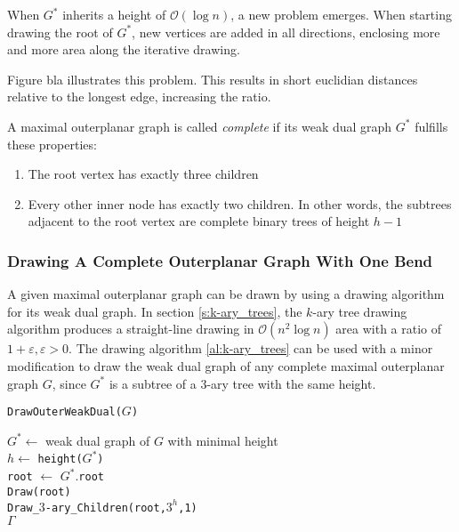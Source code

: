 When $G^*$ inherits a height of $\mathcal{O}(\log n)$, a new problem emerges. When starting drawing the root of $G^*$, new vertices are added in all directions, enclosing more and more area along the iterative drawing. 

Figure bla illustrates this problem. 
This results in short euclidian distances relative to the longest edge, increasing the ratio.\\
\begin{definition}
A maximal outerplanar graph is called \emph{complete} if its weak dual graph $G^*$ fulfills these properties:
\begin{enumerate}
	\item The root vertex has exactly three children
	\item Every other inner node has exactly two children. In other words, the subtrees adjacent to the root vertex are complete binary trees of height $h-1$
\end{enumerate}
\end{definition}

\subsubsection{Drawing A Complete Outerplanar Graph With One Bend}

A given maximal outerplanar graph can be drawn by using a drawing algorithm for its weak dual graph. In section \ref{s:k-ary_trees}, the $k$-ary tree drawing algorithm produces a straight-line drawing in $\mathcal{O}(n^2 \log n)$ area with a ratio of $1+\varepsilon,\varepsilon>0$. The drawing algorithm \ref{al:k-ary_trees} can be used with a minor modification to draw the weak dual graph of any complete maximal outerplanar graph $G$, since $G^*$ is a subtree of a $3$-ary tree with the same height.\\

\begin{algorithm}[H]
	\caption{\texttt{DrawOuterWeakDual($G$)}}\label{al:drawouterweakdual}
	$G^* \gets$ weak dual graph of $G$ with minimal height\\
	$h \gets$ \texttt{height($G^*$)}\\
	\texttt{root} $\gets$ $G^*$.\texttt{root}\\
	\texttt{Draw(root)}\\
	\texttt{Draw\_$3$-ary\_Children(\texttt{root},$3^h$,1)}\\
	\Return $\Gamma$
\end{algorithm}

